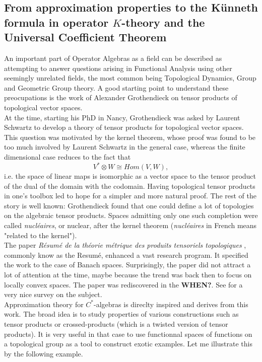 \subsection{From approximation properties to the K\"unneth formula in operator $K$-theory and the Universal Coefficient Theorem}

An important part of Operator Algebras as a field can be described as attempting to answer questions arising in Functional Analysis using other seemingly unrelated fields, the most common being Topological Dynamics, Group and Geometric Group theory. A good starting point to understand these preocupations is the work of Alexander Grothendieck on tensor products of topological vector spaces. \\

At the time, starting his PhD in Nancy, Grothendieck was asked by Laurent Schwartz to develop a theory of tensor products for topological vector spaces. This question was motivated by the kernel theorem, whose proof was found to be too much involved by Laurent Schwartz in the general case, whereas the finite dimensional case reduces to the fact that 
\[V^*\otimes W \cong Hom(V,W),\] 
i.e. the space of linear maps is isomorphic as a vector space to the tensor product of the dual of the domain with the codomain. Having topological tensor products in one's toolbox led to hope for a simpler and more natural proof. The rest of the story is well known: Grothendieck found that one could define a lot of topologies on the algebraic tensor products. Spaces admitting only one such completion were called \textit{nucl\'eaires}, or nuclear, after the kernel theorem (\textit{nucl\'eaires} in French means "related to the kernel").\\

The paper \textit{R\'esum\'e de la th\'eorie m\'etrique des produits tensoriels topologiques} \cite{GrothendieckResume}, commonly know as the Resum\'e, enhanced a vast research program. It specified the work to the case of Banach spaces. Surprisingly, the paper did not attract a lot of attention at the time, maybe because the trend was back then to focus on locally convex spaces. The paper was rediscovered in the \textbf{WHEN?}. See \cite{PisierSurvey} for a very nice survey on the subject.\\

Approximation theory for $C^*$-algebras is direclty inspired and derives from this work. The broad idea is to study properties of various constructions such as tensor products or crossed-products (which is a twisted version of tensor products). It is very useful in that case to use functionnal spaces of functions on a topological group as a tool to construct exotic examples. Let me illustrate this by the following example.\\

